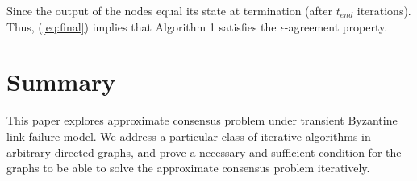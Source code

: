\documentclass{llncs}
\begin{document}
Since the output of the nodes equal its state at termination (after $t_{end}$ iterations). Thus, (\ref{eq:final}) implies that Algorithm 1 satisfies the $\epsilon$-agreement property.

\section{Summary}

This paper explores approximate consensus problem under transient Byzantine link failure model. We address a particular class of iterative algorithms in arbitrary directed graphs, and prove a necessary and sufficient condition for the graphs to be able to solve the approximate consensus problem iteratively.
\end{document}
